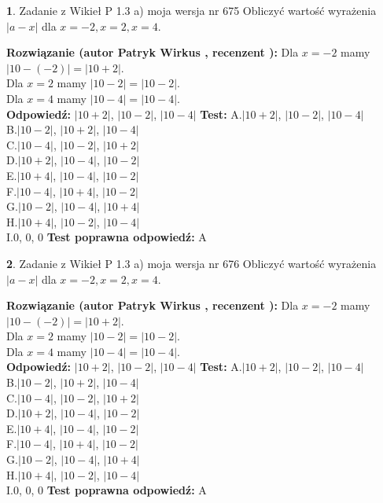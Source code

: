 \documentclass[12pt, a4paper]{article}
\theoremstyle{definition} %
\newtheorem{zad}{}
\newcommand{\zadStart}[1]{\begin{zad}#1\newline}
\newcommand{\zadStop}{\end{zad}}
\newcommand{\rozwStart}[2]{\noindent \textbf{Rozwiązanie (autor #1 , recenzent #2): }\newline}
\newcommand{\rozwStop}{\newline}
\newcommand{\odpStart}{\noindent \textbf{Odpowiedź:}\newline}
\newcommand{\odpStop}{\newline}
\newcommand{\testStart}{\noindent \textbf{Test:}\newline}
\newcommand{\testStop}{\newline}
\newcommand{\kluczStart}{\noindent \textbf{Test poprawna odpowiedź:}\newline}
\newcommand{\kluczStop}{\newline}
\begin{document}
\zadStart{Zadanie z Wikieł P 1.3 a) moja wersja nr 675}
Obliczyć wartość wyrażenia $|a - x|$ dla $x=-2,x=2,x=4$.
\zadStop
\rozwStart{Patryk Wirkus}{}
Dla $x = -2$ mamy $|10 - (-2)| = |10 + 2|$.\\
Dla $x = 2$ mamy $|10 - 2| = |10 - 2|$.\\
Dla $x = 4$ mamy $|10 - 4| = |10 - 4|$.\\
\rozwStop
\odpStart
$|10 + 2|$, $|10 - 2|$, $|10 - 4|$
\odpStop
\testStart
A.$|10 + 2|$, $|10 - 2|$, $|10 - 4|$\\
B.$|10 - 2|$, $|10 + 2|$, $|10 - 4|$\\
C.$|10 - 4|$, $|10 - 2|$, $|10 + 2|$\\
D.$|10 + 2|$, $|10 - 4|$, $|10 - 2|$\\
E.$|10 + 4|$, $|10 - 4|$, $|10 - 2|$\\
F.$|10 - 4|$, $|10 + 4|$, $|10 - 2|$\\
G.$|10 - 2|$, $|10 - 4|$, $|10 + 4|$\\
H.$|10 + 4|$, $|10 - 2|$, $|10 - 4|$\\
I.$0$, $0$, $0$
\testStop
\kluczStart
A
\kluczStop



\zadStart{Zadanie z Wikieł P 1.3 a) moja wersja nr 676}
Obliczyć wartość wyrażenia $|a - x|$ dla $x=-2,x=2,x=4$.
\zadStop
\rozwStart{Patryk Wirkus}{}
Dla $x = -2$ mamy $|10 - (-2)| = |10 + 2|$.\\
Dla $x = 2$ mamy $|10 - 2| = |10 - 2|$.\\
Dla $x = 4$ mamy $|10 - 4| = |10 - 4|$.\\
\rozwStop
\odpStart
$|10 + 2|$, $|10 - 2|$, $|10 - 4|$
\odpStop
\testStart
A.$|10 + 2|$, $|10 - 2|$, $|10 - 4|$\\
B.$|10 - 2|$, $|10 + 2|$, $|10 - 4|$\\
C.$|10 - 4|$, $|10 - 2|$, $|10 + 2|$\\
D.$|10 + 2|$, $|10 - 4|$, $|10 - 2|$\\
E.$|10 + 4|$, $|10 - 4|$, $|10 - 2|$\\
F.$|10 - 4|$, $|10 + 4|$, $|10 - 2|$\\
G.$|10 - 2|$, $|10 - 4|$, $|10 + 4|$\\
H.$|10 + 4|$, $|10 - 2|$, $|10 - 4|$\\
I.$0$, $0$, $0$
\testStop
\kluczStart
A
\kluczStop
\end{document}
